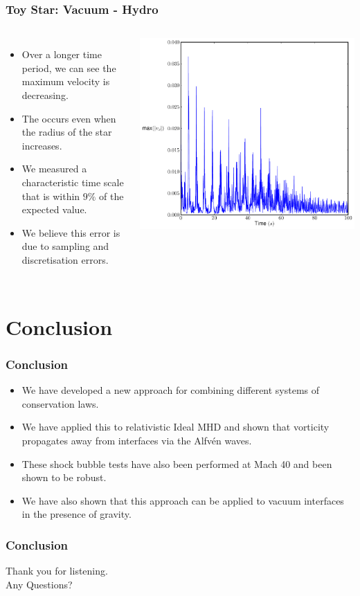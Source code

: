 \documentclass{beamer}
\begin{document}
\begin{frame}
\frametitle{Toy Star: Vacuum - Hydro}
\begin{columns}
\begin{itemize}
\item{Over a longer time period, we can see the maximum velocity is decreasing.}
\item{The occurs even when the radius of the star increases.}
\item{We measured a characteristic time scale that is within $9\%$ of the expected value.}
\item{We believe this error is due to sampling and discretisation errors.}
\end{itemize}
\centering
\includegraphics[width=\textwidth]{../images/toy_max_vx}
\end{columns}
\end{frame}

\section{Conclusion}
\begin{frame}
\frametitle{Conclusion}
\begin{itemize}
\item{We have developed a new approach for combining different systems of conservation laws.}
\item{We have applied this to relativistic Ideal MHD and shown that vorticity propagates away from interfaces via the Alfv\'{e}n waves.}
\item{These shock bubble tests have also been performed at Mach 40 and been shown to be robust.}
\item{We have also shown that this approach can be applied to vacuum interfaces in the presence of gravity.}
\end{itemize}
\end{frame}
\begin{frame}
\frametitle{Conclusion}
\centering
Thank you for listening.\\
Any Questions?
\end{frame}
\end{document}
